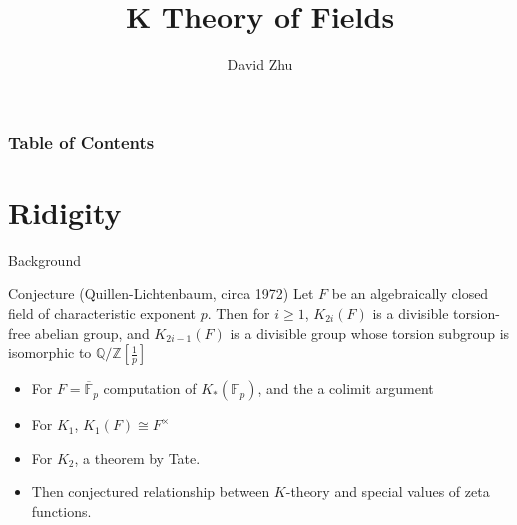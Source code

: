 \documentclass{beamer}
\title[K Theory of Fields]{K Theory of Fields}
\author[David Zhu]{David Zhu}
\begin{document}
\frame{\titlepage}


\begin{frame}
\frametitle{Table of Contents}
\tableofcontents
\end{frame}



\section{Ridigity}
\begin{frame}{Background}
  \begin{block}{Conjecture (Quillen-Lichtenbaum, circa 1972)}
   Let $F$ be an algebraically closed field of characteristic exponent $p$. Then for $i\geq 1$, $K_{2i}(F)$ is a divisible torsion-free abelian group, and  $K_{2i-1}(F)$ is a divisible group whose torsion subgroup is isomorphic to $\mathbb{Q}/\mathbb{Z}[\frac{1}{p}]$
  \end{block}
\begin{itemize}
  \item For $F=\overline{\mathbb{F}}_p$ computation of $K_*(\mathbb{F}_{p})$, and the a colimit argument \pause
  \item For $K_1$, $K_1(F)\cong F^{\times}$
  \item For $K_2$,  a theorem by Tate.
  \item Then conjectured relationship between $K$-theory and special values of zeta functions.

\end{itemize}







\end{frame}
\end{document}
